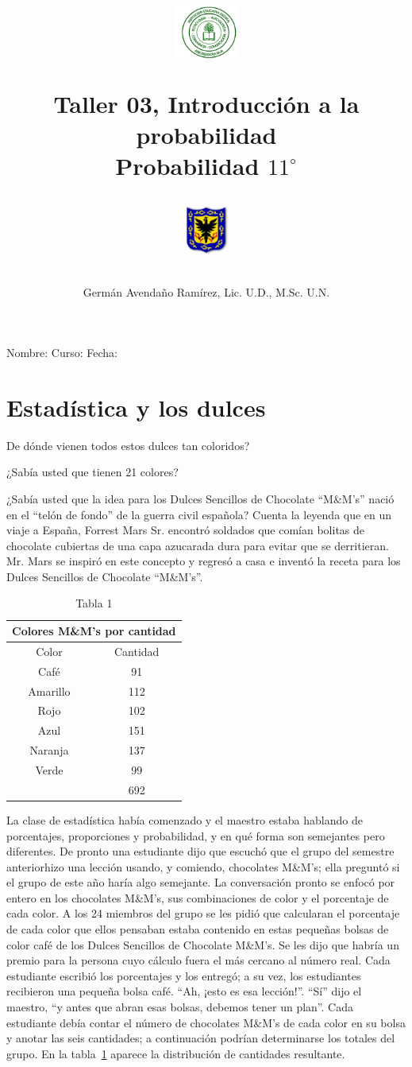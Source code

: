 \documentclass[10pt,twoside]{article}
\author{Germ\'an Avenda\~no Ram\'irez, Lic. U.D., M.Sc. U.N.}
\title{\begin{minipage}{.2\textwidth}
\includegraphics[height=1.75cm]{Images/logo-colegio.png}\end{minipage}
\begin{minipage}{.55\textwidth}
\begin{center}
Taller 03, Introducción a la probabilidad\\
Probabilidad $11^{\circ}$
\end{center}
\end{minipage}\hfill
\begin{minipage}{.2\textwidth}
\includegraphics[height=1.75cm]{Images/logo-sed.png} 
\end{minipage}}
\date{}
\begin{document}
\maketitle
Nombre: \hrulefill Curso: \underline{\hspace*{44pt}} Fecha: \underline{\hspace*{2.5cm}}
\section*{Estad\'istica y los dulces}
De dónde vienen todos estos dulces tan coloridos?

¿Sabía usted que tienen 21 colores?

¿Sabía usted que la idea para los Dulces Sencillos de Chocolate “M\&M’s” nació
en el “telón de fondo” de la guerra civil española? Cuenta la leyenda que en un
viaje a España, Forrest Mars Sr. encontró soldados que comían bolitas de chocolate
cubiertas de una capa azucarada dura para evitar que se derritieran. Mr. Mars se
inspiró en este concepto y regresó a casa e inventó la receta para los Dulces Sencillos de Chocolate “M\&M’s”.
\begin{table}[h!]
\centering
\begin{tabular}{cc}
\multicolumn{2}{c}{Colores M\&M's por cantidad} \\ \hline
Color & Cantidad \\ \hline
Café & 91 \\ 
Amarillo & 112 \\ 
Rojo & 102 \\ 
Azul & 151 \\ 
Naranja & 137 \\ 
Verde & 99 \\ \cline{2-2}
 & 692 \\ 
\hline
\end{tabular}
\caption{Tabla 1} \label{tab1}
\end{table}

La clase de estadística había comenzado y el maestro estaba hablando de porcentajes, proporciones y probabilidad, y en qué forma son semejantes pero diferentes. De pronto una estudiante dijo que escuchó que el grupo del semestre anteriorhizo una lección usando, y comiendo, chocolates M\&M’s; ella preguntó si el grupo
de este año haría algo semejante. La conversación pronto se enfocó por entero en los chocolates M\&M’s, sus combinaciones de color y el porcentaje de cada color. A los 24 miembros del grupo se les pidió que calcularan el porcentaje de cada color que ellos pensaban estaba contenido en estas pequeñas bolsas de color café de los
Dulces Sencillos de Chocolate M\&M’s. Se les dijo que habría un premio para la persona cuyo cálculo fuera el más cercano al número real. Cada estudiante escribió los porcentajes y los entregó; a su vez, los estudiantes recibieron una pequeña bolsa café. “Ah, ¡esto es esa lección!”. “Sí” dijo el maestro, “y antes que abran esas
bolsas, debemos tener un plan”. Cada estudiante debía contar el número de chocolates M\&M's de cada color en su bolsa y anotar las seis cantidades; a continuación podrían determinarse los totales del grupo. En la tabla~\ref{tab1} aparece la distribución de cantidades resultante.
\end{document}
